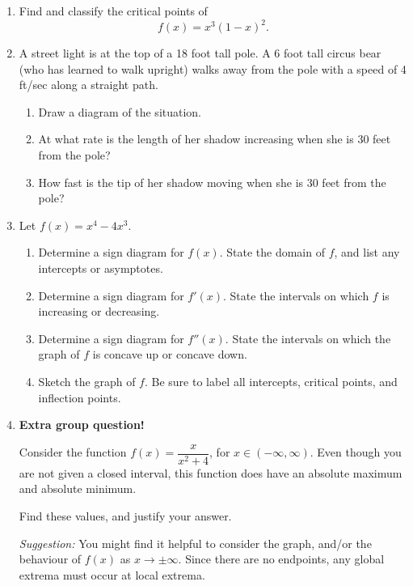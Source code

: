 \documentclass[12pt]{article}
\newcommand{\points}[1]{\marginpar{\hspace{24pt}[#1]}}
\begin{document}
 \begin{enumerate}
 \item  Find and classify the critical points of \points{5}
 \[
 f(x) = x^3(1-x)^2.
 \]
 
 \vspace{7cm}
 
 \item A street light is at the top of a 18 foot tall pole. A 6 foot tall circus bear (who has learned to walk upright) walks away from the pole with a speed of 4 ft/sec along a straight path. 
\begin{enumerate}
\item Draw a diagram of the situation. \points{1}
\item At what rate is the length of her shadow increasing when she is 30 feet from the pole?\points{2}
\item How fast is the tip of her shadow moving when she is 30 feet from the pole? \points{2}
\end{enumerate} 
 \newpage
 
 \item Let $f(x) = x^4-4x^3$.
 \begin{enumerate}
 \item Determine a sign diagram for $f(x)$. \points{2} State the domain of $f$, and list any intercepts or asymptotes.
 \item Determine a sign diagram for $f'(x)$. \points{3} State the intervals on which $f$ is increasing or decreasing.
 \item Determine a sign diagram for $f''(x)$.\points{3} State the intervals on which the graph of $f$ is concave up or concave down.
 \item Sketch the graph of $f$.\points{2} Be sure to label all intercepts, critical points, and inflection points.
 \end{enumerate}
 \newpage

\item \textbf{Extra group question!}

\medskip

Consider the function $f(x)=\dfrac{x}{x^2+4}$, for $x\in (-\infty, \infty)$. Even though you are not given a closed interval, this function does have an absolute maximum and absolute minimum.

\medskip

Find these values, and justify your answer. \points{4}

\bigskip

\textit{Suggestion:} You might find it helpful to consider the graph, and/or the behaviour of $f(x)$ as $x\to \pm \infty$. Since there are no endpoints, any global extrema must occur at local extrema. 
\end{enumerate}
\end{document}
